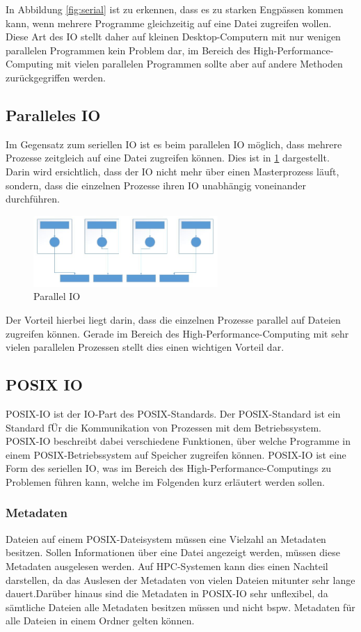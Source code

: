 In Abbildung \ref{fig:serial} ist zu erkennen, dass es zu starken Engp\"assen kommen kann, wenn mehrere Programme gleichzeitig auf eine Datei zugreifen wollen. Diese Art des IO stellt daher auf kleinen Desktop-Computern mit nur wenigen parallelen Programmen kein Problem dar, im Bereich des High-Performance-Computing mit vielen parallelen Programmen sollte aber auf andere Methoden zur\"uckgegriffen werden.\cite{Cazes.26.09.2013}

\subsection{Paralleles IO}
Im Gegensatz zum seriellen IO ist es beim parallelen IO m\"oglich, dass mehrere Prozesse zeitgleich auf eine Datei zugreifen k\"onnen. Dies ist in \ref{fig:parallel} dargestellt. Darin wird ersichtlich, dass der IO nicht mehr \"uber einen Masterprozess l\"auft, sondern, dass die einzelnen Prozesse ihren IO unabh\"angig voneinander durchf\"uhren.
\begin{figure}[h]
	\centering
	\includegraphics[width=7cm]{fig/ParallelIO.JPG}
	\caption{Parallel IO \cite{Cazes.26.09.2013}}
	\label{fig:parallel}
\end{figure}
Der Vorteil hierbei liegt darin, dass die einzelnen Prozesse parallel auf Dateien zugreifen k\"onnen. Gerade im Bereich des High-Performance-Computing mit sehr vielen parallelen Prozessen stellt dies einen wichtigen Vorteil dar.\cite{Cazes.26.09.2013}
\subsection{POSIX IO}
POSIX-IO ist der IO-Part des POSIX-Standards. Der POSIX-Standard ist ein Standard f\"Ur die Kommunikation von Prozessen mit dem Betriebssystem. POSIX-IO beschreibt dabei verschiedene Funktionen, \"uber welche Programme in einem POSIX-Betriebssystem auf Speicher zugreifen k\"onnen. POSIX-IO ist eine Form des seriellen IO, was im Bereich des High-Performance-Computings zu Problemen f\"uhren kann, welche im Folgenden kurz erl\"autert werden sollen.
\subsubsection{Metadaten}
Dateien auf einem POSIX-Dateisystem m\"ussen eine Vielzahl an Metadaten besitzen. Sollen Informationen \"uber eine Datei angezeigt werden, m\"ussen diese Metadaten ausgelesen werden. Auf HPC-Systemen kann dies einen Nachteil darstellen, da das Auslesen der Metadaten von vielen Dateien mitunter sehr lange dauert\cite{Layton.02.03.2010}.Dar\"uber hinaus sind die Metadaten in POSIX-IO sehr unflexibel, da s\"amtliche Dateien alle Metadaten besitzen m\"ussen und nicht bspw. Metadaten f\"ur alle Dateien in einem Ordner gelten k\"onnen.
